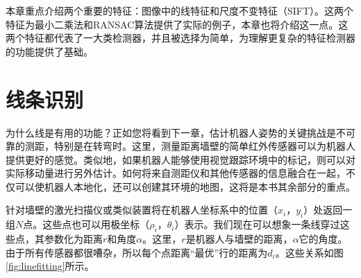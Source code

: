 本章重点介绍两个重要的特征：图像中的线特征和尺度不变特征（SIFT）。这两个特征为最小二乘法和RANSAC算法提供了实际的例子，本章也将介绍这一点。这两个特征都代表了一大类检测器，并且被选择为简单，为理解更复杂的特征检测器的功能提供了基础。


\section{线条识别}



为什么线是有用的功能？正如您将看到下一章，估计机器人姿势的关键挑战是不可靠的测距，特别是在转弯时。这里，测量距离墙壁的简单红外传感器可以为机器人提供更好的感觉。类似地，如果机器人能够使用视觉跟踪环境中的标记，则可以对实际移动量进行另外估计。如何将来自测距仪和其他传感器的信息融合在一起，不仅可以使机器人本地化，还可以创建其环境的地图，这将是本书其余部分的重点。

针对墙壁的激光扫描仪或类似装置将在机器人坐标系中的位置$（x_i，y_i）$处返回一组$N$点。这些点也可以用极坐标$（\rho_i，\theta_i）$表示。我们现在可以想象一条线穿过这些点，其参数化为距离$r$和角度$\alpha$。这里，$r$是机器人与墙壁的距离，$\alpha$它的角度。由于所有传感器都很嘈杂，所以每个点距离“最优”行的距离为$d_i$。这些关系如图\ref{fig:linefitting}所示。


